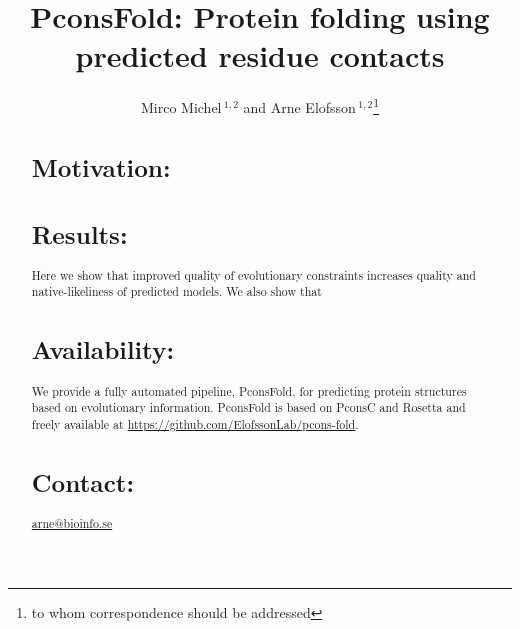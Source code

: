 \documentclass{bioinfo}
\begin{document}

\title[PconsFold]{PconsFold: Protein folding using predicted residue contacts}
\author[M.Michel \textit{et~al}]{Mirco Michel\,$^{1,2}$ and Arne Elofsson\,$^{1,2}$\footnote{to whom correspondence should be addressed}}
\address{$^{1}$Department of Biochemistry and Biophysics, Stockholm University, 10691 Stockholm, Sweden\\
$^{2}$Science for Life Laboratory, Box 1031, 17121 Solna, Sweden}



\maketitle

\begin{abstract}

\section{Motivation:}

\section{Results:}
Here we show that improved quality of evolutionary constraints increases quality and native-likeliness of predicted models. We also show that 
\section{Availability:}
We provide a fully automated pipeline, PconsFold, for predicting protein structures based on evolutionary information. PconsFold is based on PconsC and Rosetta and freely available at \url{https://github.com/ElofssonLab/pcons-fold}.
\section{Contact:} \href{arne@bioinfo.se}{arne@bioinfo.se}
\end{abstract}
\end{document}
